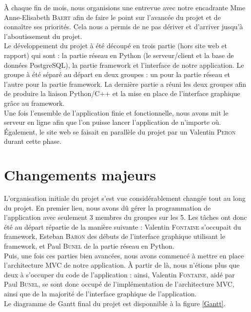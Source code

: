 \documentclass{report}
\begin{document}
À chaque fin de mois, nous organisions une entrevue avec notre encadrante Mme Anne-Elisabeth \textsc{Baert} afin de faire le point sur l'avancée du projet et de connaître ses priorités. Cela nous a permis de ne pas dériver et d'arriver jusqu'à l'aboutissement du projet. \\

Le développement du projet à été découpé en trois partie (hors site web et rapport) qui sont : la partie réseau en Python (le serveur/client et la base de données PostgreSQL), la partie framework et l'interface de notre application. Le groupe à été séparé au départ en deux groupes : un pour la partie réseau et l'autre pour la partie framework. La dernière partie a réuni les deux groupes afin de produire la liaison Python/C++ et la mise en place de l'interface graphique grâce au framework. \\

Une fois l'ensemble de l'application finie et fonctionnelle, nous avons mit le serveur en ligne afin que l'on puisse lancer l'application de n'importe où. \\
Également, le site web se faisait en parallèle du projet par un Valentin \textsc{Peron} durant cette phase.\\

\section{Changements majeurs}
L'organisation initiale du projet s'est vue considérablement changée tout au long du projet. En premier lieu, nous avons dû gérer la programmation de l'application avec seulement 3 membres du groupes sur les 5. Les tâches ont donc été au départ répartie de la manière suivante : Valentin \textsc{Fontaine} s'occupait du framework, Esteban \textsc{Baron} des débuts de l'interface graphique utilisant le framework, et Paul \textsc{Bunel} de la partie réseau en Python. \\
Puis, une fois ces parties bien avancées, nous avons commencé à mettre en place l'architecture MVC de notre application. À partir de là, nous n'étions plus que deux à s'occuper du code de l'application : ainsi, Valentin \textsc{Fontaine}, aidé par Paul \textsc{Bunel}, se sont donc occupé de l'implémentation de l'architecture MVC, ainsi que de la majorité de l'interface graphique de l'application. \\
Le diagramme de Gantt final du projet est disponnible à la figure \ref{Gantt}.
\end{document}
